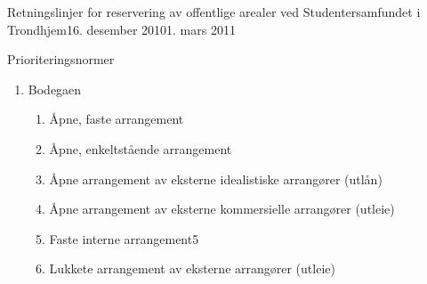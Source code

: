 \begin{instruks}{Retningslinjer for reservering av offentlige arealer
    ved Studentersamfundet i Trondhjem}{16. desember 2010}{1. mars 2011}
\begin{instruksledd}{Prioriteringsnormer}
\begin{enumerate}
\begin{enumerate}
                        \begin{enumerate}
                            \item Åpne, faste arrangementer/Studentersamfundets
                                Symfoniorchester
                            \item Fotballkamper på landskampnivå
                            \item Konserter
                            \item Andre åpne, enkeltstående arrangement
                            \item SIT-forestilling med tre generalprøvedager
                            \item Åpne arrangementer av Samfundets kunstneriske
                                gjenger
                            \item Andre øvinger
                            \item Åpne arrangementer av eksterne idealistiske
                                arrangører (utlån)
                            \item Faste interne arrangement4
                            \item Åpne arrangementer av eksterne kommersielle
                                arrangører (utleie)
                            \item Lukkete arrangement av eksterne arrangører
                                (utleie)
                            \item Interne fester
                        \end{enumerate}
                        4 For eksempel Samfundets Interne Grand Prix
                    \item Bodegaen
                        \begin{enumerate}
                            \item Åpne, faste arrangement
                            \item Åpne, enkeltstående arrangement
                            \item Åpne arrangement av eksterne idealistiske
                                arrangører (utlån)
                            \item Åpne arrangement av eksterne kommersielle
                                arrangører (utleie)
                            \item Faste interne arrangement5
                            \item Lukkete arrangement av eksterne arrangører (utleie)

\end{enumerate}
\end{enumerate}
\end{enumerate}
\end{instruksledd}
\end{instruks}

